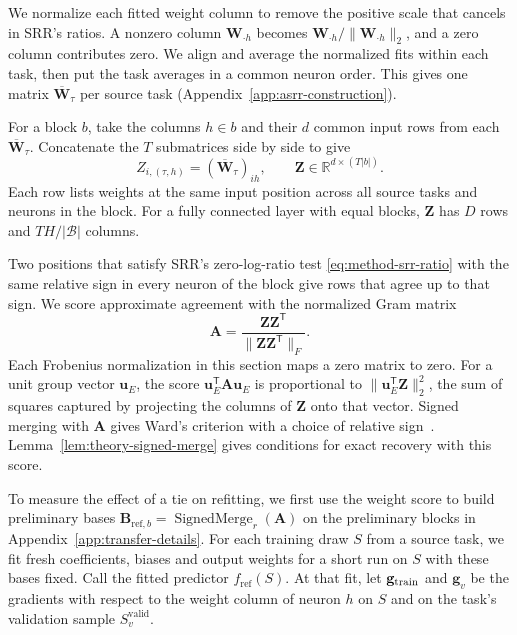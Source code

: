 We normalize each fitted weight column to remove the positive scale that
cancels in SRR's ratios. A nonzero column $\mathbf W_{\cdot h}$ becomes
$\mathbf W_{\cdot h}/\lVert\mathbf W_{\cdot h}\rVert_2$, and a zero column
contributes zero. We align and average the normalized fits within each
task, then put the task averages in a common neuron order. This gives
one matrix $\overline{\mathbf W}_\tau$ per source task
(Appendix~\ref{app:asrr-construction}).

For a block $b$, take the columns $h\in b$ and their $d$ common input
rows from each $\overline{\mathbf W}_\tau$. Concatenate the $T$
submatrices side by side to give
\[
    Z_{i,(\tau,h)}=(\overline{\mathbf W}_\tau)_{ih},
    \qquad \mathbf Z\in\mathbb R^{d\times(T\lvert b\rvert)}.
\]
Each row lists weights at the same input position across all source
tasks and neurons in the block. For a fully connected layer with equal
blocks, $\mathbf Z$ has $D$ rows and $TH/\lvert\mathcal B\rvert$ columns.

Two positions that satisfy SRR's zero-log-ratio test
\eqref{eq:method-srr-ratio} with the same relative sign in every neuron
of the block give rows that agree up to that sign. We score approximate
agreement with the normalized Gram matrix
\[
    \mathbf A=\frac{\mathbf Z\mathbf Z^{\mathsf T}}
        {\lVert\mathbf Z\mathbf Z^{\mathsf T}\rVert_F}.
\]
Each Frobenius normalization in this section maps a zero matrix to zero.
For a unit group vector $\mathbf u_E$, the score
$\mathbf u_E^{\mathsf T}\mathbf A\mathbf u_E$ is proportional to
$\lVert\mathbf u_E^{\mathsf T}\mathbf Z\rVert_2^2$, the sum of squares
captured by projecting the columns of $\mathbf Z$ onto that vector.
Signed merging with $\mathbf A$ gives Ward's criterion with a choice
of relative sign~\citep{ward1963hierarchical}.
Lemma~\ref{lem:theory-signed-merge} gives conditions for exact recovery
with this score.

To measure the effect of a tie on refitting, we first use the weight
score to build preliminary bases
$\mathbf B_{\mathrm{ref},b}=\operatorname{SignedMerge}_r(\mathbf A)$
on the preliminary blocks in Appendix~\ref{app:transfer-details}.
For each training draw $S$ from a source task, we fit fresh coefficients,
biases and output weights for a short run on $S$ with these bases fixed.
Call the fitted predictor $f_{\mathrm{ref}}(S)$. At that fit, let
$\mathbf g_{\rm train}$ and $\mathbf g_v$ be the gradients with respect
to the weight column of neuron $h$ on $S$ and on the task's validation
sample $S_v^{\mathrm{valid}}$.

